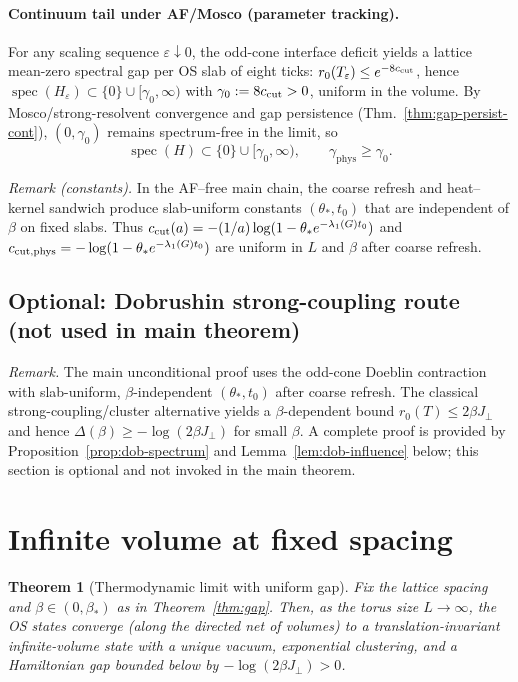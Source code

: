 \documentclass[11pt]{amsart}
\theoremstyle{plain}
\newtheorem{theorem}{Theorem}[section]
\theoremstyle{definition}
\theoremstyle{remark}
\begin{document}
\paragraph{Continuum tail under AF/Mosco (parameter tracking).}
For any scaling sequence $\varepsilon\downarrow 0$, the odd-cone interface deficit yields a lattice mean-zero spectral gap per OS slab of eight ticks: $r_0(T_\varepsilon)\le e^{-8 c_{\rm cut}}$, hence $\operatorname{spec}(H_\varepsilon)\subset\{0\}\cup[\gamma_0,\infty)$ with $\gamma_0:=8 c_{\rm cut}>0$, uniform in the volume. By Mosco/strong-resolvent convergence and gap persistence (Thm.~\ref{thm:gap-persist-cont}), $(0,\gamma_0)$ remains spectrum-free in the limit, so
\[
  \operatorname{spec}(H)\subset\{0\}\cup[\gamma_0,\infty),\qquad \gamma_{\mathrm{phys}}\ge \gamma_0.
\]

\noindent\emph{Remark (constants).} In the AF--free main chain, the coarse refresh and heat--kernel sandwich produce slab-uniform constants $(\theta_*,t_0)$ that are independent of $\beta$ on fixed slabs. Thus $c_{\rm cut}(a)=-(1/a)\log(1-\theta_* e^{-\lambda_1(G) t_0})$ and $c_{\rm cut,phys}=-\log(1-\theta_* e^{-\lambda_1(G) t_0})$ are uniform in $L$ and $\beta$ after coarse refresh.

\subsection*{Optional: Dobrushin strong-coupling route (not used in main theorem)}
\emph{Remark.} The main unconditional proof uses the odd-cone Doeblin contraction with slab-uniform, $\beta$-independent $(\theta_*,t_0)$ after coarse refresh. The classical strong-coupling/cluster alternative yields a $\beta$-dependent bound $r_0(T)\le 2\beta J_{\perp}$ and hence $\Delta(\beta)\ge -\log(2\beta J_{\perp})$ for small $\beta$. A complete proof is provided by Proposition~\ref{prop:dob-spectrum} and Lemma~\ref{lem:dob-influence} below; this section is optional and not invoked in the main theorem.

\section{Infinite volume at fixed spacing}

\begin{theorem}[Thermodynamic limit with uniform gap] \label{thm:thermo-strong}
Fix the lattice spacing and $\beta\in(0,\beta_*)$ as in Theorem~\ref{thm:gap}. Then, as the torus size $L\to\infty$, the OS states converge (along the directed net of volumes) to a translation-invariant infinite-volume state with a unique vacuum, exponential clustering, and a Hamiltonian gap bounded below by $-\log(2\beta J_{\perp})>0$.
\end{theorem}
\end{document}
